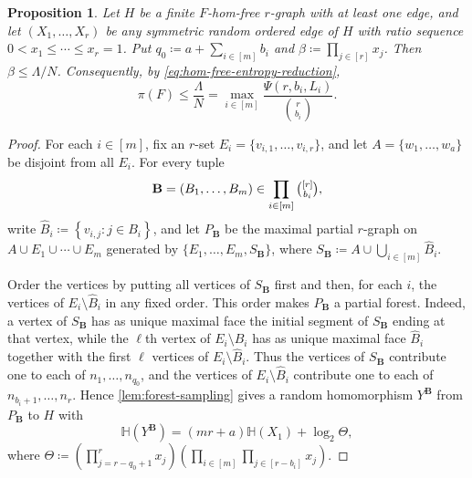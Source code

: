 \documentclass[10pt,a4paper]{article}
\theoremstyle{plain}
\newtheorem{proposition}[proposition]{Proposition}
\theoremstyle{definition}
\theoremstyle{plain}
\newcommand{\HH}{\mathbb H}
\begin{document}
\begin{proposition}\label{prop:product-block}
Let $H$ be a finite $F$-hom-free $r$-graph with at least one edge, and let $(X_1,\ldots,X_r)$ be any symmetric random ordered edge of $H$ with ratio sequence $0<x_1\le\cdots\le x_r=1$.  Put $q_0\coloneqq a+\sum_{i\in [m]} b_i$ and $\beta\coloneqq\prod_{j\in [r]} x_j$.  Then $\beta \le \Lambda/N$. 
Consequently, by \cref{eq:hom-free-entropy-reduction},
\[
        \pi(F)\le\frac{\Lambda}{N}
        =\max_{i\in[m]}\frac{\Psi(r,b_i,L_i)}{\binom{r}{b_i}}.
\]
\end{proposition}

\begin{proof}
For each $i\in[m]$, fix an $r$-set $E_i=\{v_{i,1},\ldots,v_{i,r}\}$, and let $A=\{w_1,\ldots,w_a\}$ be disjoint from all $E_i$.  For every tuple
\[
        \mathbf B=(B_1,\ldots,B_m)\in\prod_{i\in [m]}\tbinom{[r]}{b_i},
\]
write $\hat{B}_i\coloneqq\left\{v_{i,j}:j\in B_i\right\}$, and let $P_{\mathbf B}$ be the maximal partial $r$-graph on $A\cup E_1\cup\cdots\cup E_m$ generated by $\{E_1,\ldots,E_m, S_{\mathbf B}\}$, where $S_{\mathbf B}\coloneqq A\cup\bigcup_{i\in [m]}\hat{B}_i$. 

Order the vertices by putting all vertices of $S_{\mathbf B}$ first and then, for each $i$, the vertices of $E_i\setminus\hat{B}_i$ in any fixed order.  This order makes $P_{\mathbf B}$ a partial forest.  Indeed, a vertex of $S_{\mathbf B}$ has as unique maximal face the initial segment of $S_{\mathbf B}$ ending at that vertex, while the $\ell$th vertex of $E_i\setminus\hat{B}_i$ has as unique maximal face $\hat{B}_i$ together with the first $\ell$ vertices of $E_i\setminus\hat{B}_i$.  Thus the vertices of $S_{\mathbf B}$ contribute one to each of $n_1,\ldots,n_{q_0}$, and the vertices of $E_i\setminus\hat{B}_i$ contribute one to each of $n_{b_i+1},\ldots,n_r$.  Hence \cref{lem:forest-sampling} gives a random homomorphism $Y^{\mathbf B}$ from $P_{\mathbf B}$ to $H$ with
\[
        \HH(Y^{\mathbf B})=(mr+a)\HH(X_1)+\log_2\Theta,
\]
where $\Theta\coloneqq \left(\prod_{j=r-q_0+1}^{r}x_j\right) \left(\prod_{i\in [m]}\prod_{j\in [r-b_i]}x_j\right)$. 


\end{proof}
\end{document}
